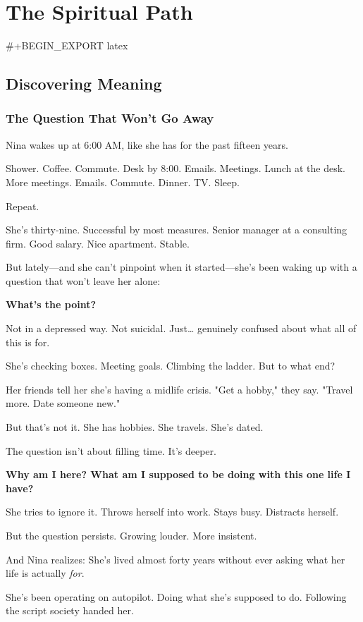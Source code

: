 \documentclass[11pt,twoside]{book}
\renewcommand{\thepart}{}
\let\oldpart\part
\renewcommand{\part}[1]{\oldpart{#1}\renewcommand{\thepart}{\relax}}
\begin{document}
\part{The Spiritual Path}

#+BEGIN_EXPORT latex
\chapter{Discovering Meaning}

\section*{The Question That Won't Go Away}

Nina wakes up at 6:00 AM, like she has for the past fifteen years.

Shower. Coffee. Commute. Desk by 8:00. Emails. Meetings. Lunch at the desk. More meetings. Emails. Commute. Dinner. TV. Sleep.

Repeat.

She's thirty-nine. Successful by most measures. Senior manager at a consulting firm. Good salary. Nice apartment. Stable.

But lately—and she can't pinpoint when it started—she's been waking up with a question that won't leave her alone:

\textbf{What's the point?}

Not in a depressed way. Not suicidal. Just\ldots{} genuinely confused about what all of this is for.

She's checking boxes. Meeting goals. Climbing the ladder. But to what end?

Her friends tell her she's having a midlife crisis. "Get a hobby," they say. "Travel more. Date someone new."

But that's not it. She has hobbies. She travels. She's dated.

The question isn't about filling time. It's deeper.

\textbf{Why am I here? What am I supposed to be doing with this one life I have?}

She tries to ignore it. Throws herself into work. Stays busy. Distracts herself.

But the question persists. Growing louder. More insistent.

And Nina realizes: She's lived almost forty years without ever asking what her life is actually \emph{for}.

She's been operating on autopilot. Doing what she's supposed to do. Following the script society handed her.
\end{document}
